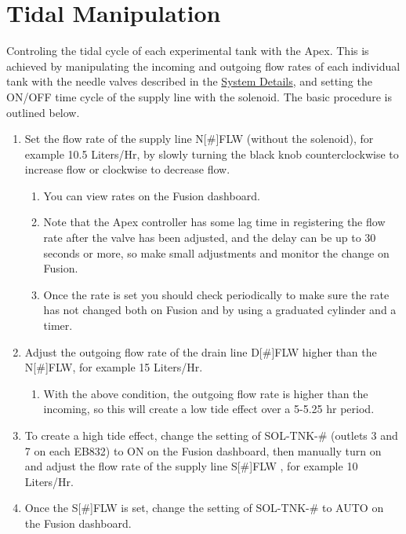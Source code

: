 \documentclass[]{book}
\providecommand{\tightlist}{%
  \setlength{\itemsep}{0pt}\setlength{\parskip}{0pt}}
\begin{document}
\chapter{Tidal Manipulation}\label{tidal-manipulation}

Controling the tidal cycle of each experimental tank with the Apex. This
is achieved by manipulating the incoming and outgoing flow rates of each
individual tank with the needle valves described in the
\protect\hyperlink{system-details}{System Details}, and setting the
ON/OFF time cycle of the supply line with the solenoid. The basic
procedure is outlined below.

\begin{enumerate}
\def\labelenumi{\arabic{enumi}.}
\tightlist
\item
  Set the flow rate of the supply line N{[}\#{]}FLW (without the
  solenoid), for example 10.5 Liters/Hr, by slowly turning the black
  knob counterclockwise to increase flow or clockwise to decrease flow.

  \begin{enumerate}
  \def\labelenumii{\arabic{enumii}.}
  \tightlist
  \item
    You can view rates on the Fusion dashboard.
  \item
    Note that the Apex controller has some lag time in registering the
    flow rate after the valve has been adjusted, and the delay can be up
    to 30 seconds or more, so make small adjustments and monitor the
    change on Fusion.
  \item
    Once the rate is set you should check periodically to make sure the
    rate has not changed both on Fusion and by using a graduated
    cylinder and a timer.
  \end{enumerate}
\item
  Adjust the outgoing flow rate of the drain line D{[}\#{]}FLW higher
  than the N{[}\#{]}FLW, for example 15 Liters/Hr.

  \begin{enumerate}
  \def\labelenumii{\arabic{enumii}.}
  \tightlist
  \item
    With the above condition, the outgoing flow rate is higher than the
    incoming, so this will create a low tide effect over a 5-5.25 hr
    period.
  \end{enumerate}
\item
  To create a high tide effect, change the setting of SOL-TNK-\#
  (outlets 3 and 7 on each EB832) to ON on the Fusion dashboard, then
  manually turn on and adjust the flow rate of the supply line
  S{[}\#{]}FLW , for example 10 Liters/Hr.\\
\item
  Once the S{[}\#{]}FLW is set, change the setting of SOL-TNK-\# to AUTO
  on the Fusion dashboard.


\end{enumerate}
\end{document}
